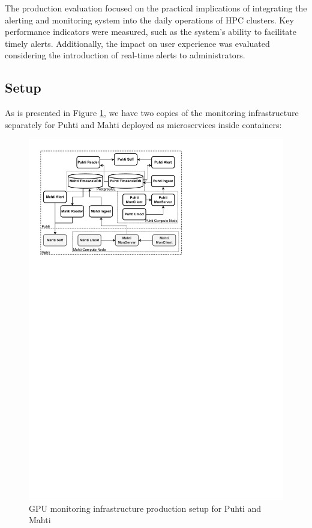 
The production evaluation focused on the practical implications of integrating the alerting and monitoring system into the daily operations of HPC clusters. Key performance indicators were measured, such as the system's ability to facilitate timely alerts. Additionally, the impact on user experience was evaluated considering the introduction of real-time alerts to administrators.

\subsection{Setup}

As is presented in Figure \ref{fig_monitoring_production_development}, we have two copies of the monitoring infrastructure separately for Puhti and Mahti deployed as microservices inside containers:

\begin{figure}[H]
    \centering
    \includegraphics[width=1\textwidth]{figures/production-deployment.pdf}
    \caption{GPU monitoring infrastructure production setup for Puhti and Mahti}
    \label{fig_monitoring_production_development}
\end{figure}

